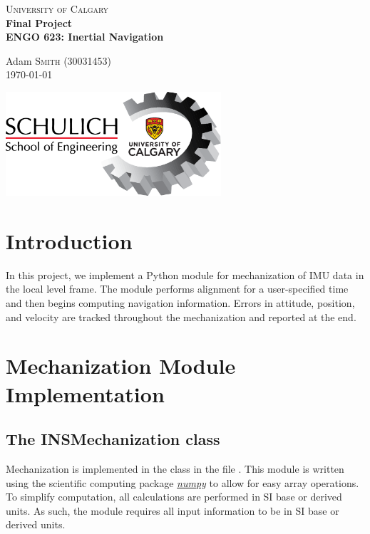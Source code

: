 \documentclass[11pt, oneside]{article}   	%
\begin{document}
\begin{titlepage}

	\center
	\textsc{\LARGE University of Calgary}\\[1.5cm]
	\vfill
	{\huge\bfseries Final Project}\\[0.4cm]
	{\huge\bfseries ENGO 623: Inertial Navigation}
	
	\vfill\vfill\vfill\vfill
	
	Adam \textsc{Smith} (30031453)\\
	
	\vfill\vfill\vfill
	{\large \today}
	
	\vfill\vfill\vfill
	\includegraphics[width=8cm,]{img/schulich.png}\\[1cm]	
\end{titlepage}

\section{Introduction}
In this project, we implement a Python module for mechanization of IMU data in the local level frame.  The module performs alignment for a user-specified time and then begins computing navigation information. Errors in attitude, position, and velocity are tracked throughout the mechanization and reported at the end.

\section{Mechanization Module Implementation}

\subsection{The INSMechanization class}
Mechanization is implemented in the  class in the file .  This module is written using the scientific computing package \href{https://numpy.org}{\textit{numpy}} to allow for easy array operations.  To simplify computation, all calculations are performed in SI base or derived units. As such, the module requires all input information to be in SI base or derived units.  
\end{document}
